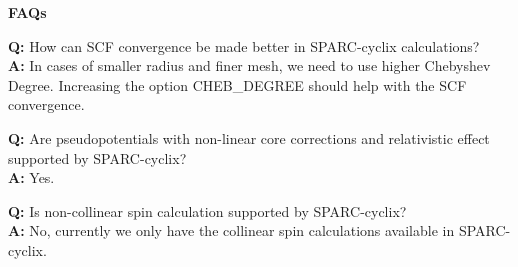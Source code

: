 \begin{frame}[allowframebreaks]{\textbf{FAQs}} \label{FAQs}

\noindent
{\bf Q:} How can SCF convergence be made better in SPARC-cyclix calculations?
 \\
{\color{blue} {\bf A:} In cases of smaller radius and finer mesh, we need to use higher Chebyshev Degree. Increasing the option CHEB\_DEGREE should help with the SCF convergence. }\\

\vspace{3mm}


{\bf Q:} Are pseudopotentials with non-linear core corrections and relativistic effect supported by SPARC-cyclix?
 \\
{\color{blue} {\bf A:} Yes.}\\

\vspace{3mm}

{\bf Q:} Is non-collinear spin calculation supported by SPARC-cyclix?
 \\
{\color{blue} {\bf A:} No, currently we only have the collinear spin calculations available in SPARC-cyclix.}\\


\end{frame}
